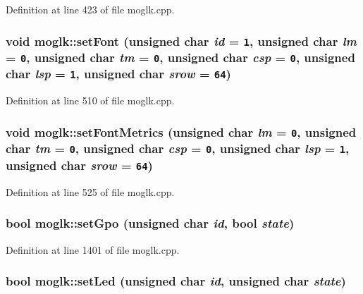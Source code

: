 Definition at line 423 of file moglk.cpp.\hypertarget{classmoglk_cfb8813e8db8de6ef0f34e479952589b}{
\subsubsection[{setFont}]{\setlength{\rightskip}{0pt plus 5cm}void moglk::setFont (unsigned char {\em id} = {\tt 1}, \/  unsigned char {\em lm} = {\tt 0}, \/  unsigned char {\em tm} = {\tt 0}, \/  unsigned char {\em csp} = {\tt 0}, \/  unsigned char {\em lsp} = {\tt 1}, \/  unsigned char {\em srow} = {\tt 64})}}
\label{classmoglk_cfb8813e8db8de6ef0f34e479952589b}




Definition at line 510 of file moglk.cpp.\hypertarget{classmoglk_17c4f023df63951df9f19f08c56f8786}{
\subsubsection[{setFontMetrics}]{\setlength{\rightskip}{0pt plus 5cm}void moglk::setFontMetrics (unsigned char {\em lm} = {\tt 0}, \/  unsigned char {\em tm} = {\tt 0}, \/  unsigned char {\em csp} = {\tt 0}, \/  unsigned char {\em lsp} = {\tt 1}, \/  unsigned char {\em srow} = {\tt 64})}}
\label{classmoglk_17c4f023df63951df9f19f08c56f8786}




Definition at line 525 of file moglk.cpp.\hypertarget{classmoglk_4acb0355df560236b463eb323a61f182}{
\subsubsection[{setGpo}]{\setlength{\rightskip}{0pt plus 5cm}bool moglk::setGpo (unsigned char {\em id}, \/  bool {\em state})}}
\label{classmoglk_4acb0355df560236b463eb323a61f182}




Definition at line 1401 of file moglk.cpp.\hypertarget{classmoglk_7a9fe2fe9dd14ac41e4c2429a5ba1312}{
\subsubsection[{setLed}]{\setlength{\rightskip}{0pt plus 5cm}bool moglk::setLed (unsigned char {\em id}, \/  unsigned char {\em state})}}
\label{classmoglk_7a9fe2fe9dd14ac41e4c2429a5ba1312}




